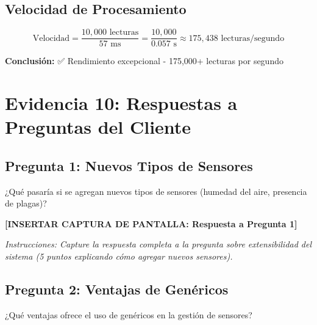 \documentclass[12pt,a4paper]{article}
\begin{document}
\subsection{Velocidad de Procesamiento}

\begin{equation}
\text{Velocidad} = \frac{10,000 \text{ lecturas}}{57 \text{ ms}} = \frac{10,000}{0.057 \text{ s}} \approx 175,438 \text{ lecturas/segundo}
\end{equation}

\textbf{Conclusión:} ✅ Rendimiento excepcional - 175,000+ lecturas por segundo


\section{Evidencia 10: Respuestas a Preguntas del Cliente}

\subsection{Pregunta 1: Nuevos Tipos de Sensores}

\begin{tcolorbox}[colback=yellow!10,colframe=orange,title=\textbf{Pregunta del Cliente}]
¿Qué pasaría si se agregan nuevos tipos de sensores (humedad del aire, presencia de plagas)?
\end{tcolorbox}

\begin{tcolorbox}[colback=green!5,colframe=green!75!black,title=\textbf{Respuesta del Sistema}]
\vspace{0.5cm}
\textbf{[INSERTAR CAPTURA DE PANTALLA: Respuesta a Pregunta 1]}

\textit{Instrucciones: Capture la respuesta completa a la pregunta sobre extensibilidad del sistema (5 puntos explicando cómo agregar nuevos sensores).}
\vspace{0.5cm}
\end{tcolorbox}

\subsection{Pregunta 2: Ventajas de Genéricos}

\begin{tcolorbox}[colback=yellow!10,colframe=orange,title=\textbf{Pregunta del Cliente}]
¿Qué ventajas ofrece el uso de genéricos en la gestión de sensores?
\end{tcolorbox}
\end{document}
